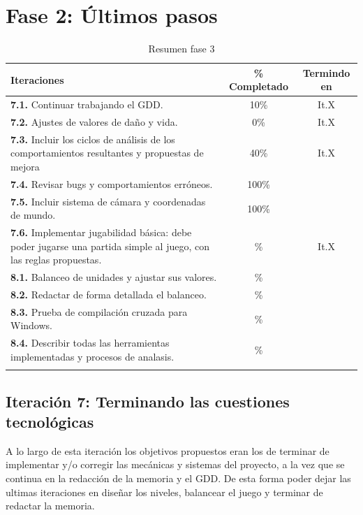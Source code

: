 \section{Fase 2: Últimos pasos}
\begin{longtable}[c]{|p{7cm}|c|c|}
\hline
Iteraciones                                                & \% Completado & Termindo en \\ 
\hline
\endhead
\textbf{7.1.} Continuar trabajando el GDD.                 & 10\% & It.X  \\
	\cmidrule[.003pt]{1-3}
\textbf{7.2.} Ajustes de valores de daño y vida.           &  0\% & It.X  \\ 
	\cmidrule[.003pt]{1-3}
\textbf{7.3.} Incluir los ciclos de análisis de los 
				comportamientos resultantes y 
				propuestas de mejora                       & 40\% & It.X  \\ 
	\cmidrule[.003pt]{1-3}
\textbf{7.4.} Revisar bugs y comportamientos erróneos.     & 100\% & \\
	\cmidrule[.003pt]{1-3}
\textbf{7.5.} Incluir sistema de cámara y coordenadas 
				de mundo.                                  & 100\% & \\
	\cmidrule[.003pt]{1-3}
\textbf{7.6.} Implementar jugabilidad básica: debe poder
				jugarse una partida simple al juego, con
				las reglas propuestas.                     & \% & It.X  \\

		\cmidrule[1pt]{1-3}

\textbf{8.1.} Balanceo de unidades y ajustar sus valores.  & \% &  \\
	\cmidrule[.003pt]{1-3}
\textbf{8.2.} Redactar de forma detallada el balanceo.     & \% &  \\
	\cmidrule[.003pt]{1-3}
\textbf{8.3.} Prueba de compilación cruzada para Windows.  & \% &  \\
	\cmidrule[.003pt]{1-3}
\textbf{8.4.} Describir todas las herramientas implementadas
				y procesos de analasis.                    & \% &  \\
\hline
\caption{Resumen fase 3}
\end{longtable}

\subsection*{Iteración 7: Terminando las cuestiones tecnológicas}
A lo largo de esta iteración los objetivos propuestos eran los de terminar de implementar y/o corregir
las mecánicas y sistemas del proyecto, a la vez que se continua en la redacción de la memoria y el GDD.
De esta forma poder dejar las ultimas iteraciones en diseñar los niveles, balancear el juego y terminar
de redactar la memoria.

